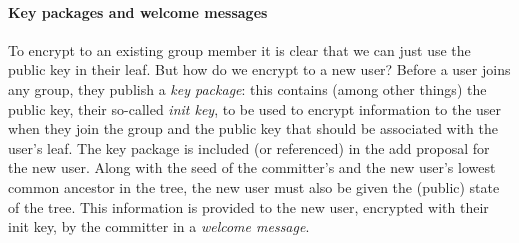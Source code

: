 \paragraph{Key packages and welcome messages} To encrypt to an existing group member it is clear that we can just use the public key in their leaf. But how do we encrypt to a new user? Before a user joins any group, they publish a \emph{key package}: this contains (among other things) the public key, their so-called \emph{init key}, to be used to encrypt information to the user when they join the group and the public key that should be associated with the user's leaf. The key package is included (or referenced) in the add proposal for the new user. Along with the seed of the committer's and the new user's lowest common ancestor in the tree, the new user must also be given the (public) state of the tree. This information is provided to the new user, encrypted with their init key, by the committer in a \emph{welcome message}.
